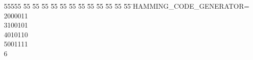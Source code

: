 %
%
\begin{tabbing}
55555 \= 55 \= 55 \= 55 \= 55 \= 55 \= 55 \= 55 \= 55 \= 55 \= 55 \= 55 \= 55 \= \>HAMMING\_CODE\_GENERATOR=\\[0pt]
2000011\ \\[0pt]
3100101\ \\[0pt]
4010110\ \\[0pt]
5001111\\[0pt]
6\>\end{tabbing}
